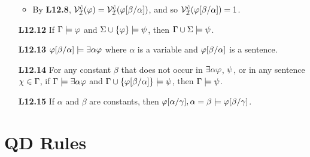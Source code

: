 \documentclass[a4paper, 11pt]{article} %
\begin{document}
\begin{enumerate}[labelsep=.1in]
\begin{itemize}
      \item By \textbf{L12.8}, $\mathcal{V}_{\mathcal{I}}^{\hat{c}}(\varphi)=\mathcal{V}_{\mathcal{I}}^{\hat{c}}(\varphi[\beta/\alpha])$, and so $\mathcal{V}_{\mathcal{I}}^{\hat{c}}(\varphi[\beta/\alpha])=1$.
    \end{itemize}
  \item[\bf L12.12] If $\Gamma \models \varphi$ and $\Sigma \cup \lbrace\varphi\rbrace \models \psi$, then $\Gamma\cup\Sigma \models \psi$.
  \item[\bf L12.13] $\varphi[\beta/\alpha] \models \exists\alpha\varphi$ where $\alpha$ is a variable and $\varphi[\beta/\alpha]$ is a sentence.
  \item[\bf L12.14] For any constant $\beta$ that does not occur in $\exists\alpha\varphi$, $\psi$, or in any sentence $\chi\in\Gamma$, if $\Gamma \models \exists\alpha\varphi$ and $\Gamma \cup \lbrace\varphi[\beta/\alpha]\rbrace \models \psi$, then $\Gamma \models \psi$.
  \item[\bf L12.15] If $\alpha$ and $\beta$ are constants, then $\varphi[\alpha/\gamma], \alpha = \beta \models \varphi[\beta/\gamma]$.
\end{enumerate}


\section*{QD Rules}
\end{document}
